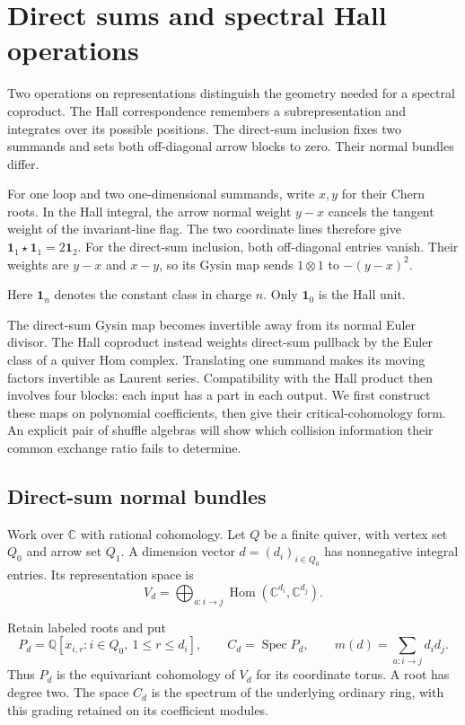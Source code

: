 \chapter{Direct sums and spectral Hall operations}
\label{cyspec:chapter}

Two operations on representations distinguish the geometry needed
for a spectral coproduct. The Hall correspondence remembers a
subrepresentation and integrates over its possible positions.
The direct-sum inclusion fixes two summands and sets both
off-diagonal arrow blocks to zero. Their normal bundles differ.

For one loop and two one-dimensional summands, write $x,y$ for
their Chern roots. In the Hall integral, the arrow normal weight
$y-x$ cancels the tangent weight of the invariant-line flag.
The two coordinate lines therefore give
$\mathbf 1_1\star\mathbf 1_1=2\mathbf 1_2$.
For the direct-sum inclusion, both off-diagonal entries vanish.
Their weights are $y-x$ and $x-y$, so its Gysin map sends
$1\otimes1$ to $-(y-x)^2$.

Here $\mathbf 1_n$ denotes the constant class in charge $n$.
Only $\mathbf 1_0$ is the Hall unit.

The direct-sum Gysin map becomes invertible away from its normal
Euler divisor. The Hall coproduct instead weights direct-sum
pullback by the Euler class of a quiver Hom complex. Translating
one summand makes its moving factors invertible as Laurent series.
Compatibility with the Hall product then involves four blocks:
each input has a part in each output.
We first construct these maps on polynomial coefficients, then
give their critical-cohomology form. An explicit pair of shuffle
algebras will show which collision information their common
exchange ratio fails to determine.

\section{Direct-sum normal bundles}
\label{cyspec:sec:direct-sums}

Work over $\mathbb C$ with rational cohomology. Let $Q$ be a finite
quiver, with vertex set $Q_0$ and arrow set $Q_1$.
A dimension vector $d=(d_i)_{i\in Q_0}$ has nonnegative integral entries.
Its representation space is
\[
 V_d=\bigoplus_{a:i\to j}\operatorname{Hom}(\mathbb C^{d_i},
                                           \mathbb C^{d_j}).
\]

Retain labeled roots and put
\[
 P_d=\mathbb Q[x_{i,r}:i\in Q_0,\ 1\leq r\leq d_i],
 \qquad C_d=\operatorname{Spec}P_d,
 \qquad m(d)=\sum_{a:i\to j}d_i d_j.
\]
Thus $P_d$ is the equivariant cohomology of $V_d$ for its coordinate
torus. A root has degree two. The space $C_d$ is the spectrum of the underlying
ordinary ring, with this grading retained on its coefficient modules.

